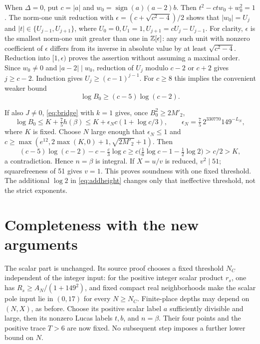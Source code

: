 \documentclass[11pt,a4paper]{article}
\begin{document}
When $\Delta=0$, put $c=|a|$ and $w_0=\operatorname{sign}(a)(a-2)b$.
Then $t^2-ctw_0+w_0^2=1$. The norm-one unit reduction with
$\epsilon=(c+\sqrt{c^2-4})/2$ shows that $|w_0|=U_j$ and
$|t|\in\{U_{j-1},U_{j+1}\}$, where
$U_0=0,U_1=1,U_{j+1}=cU_j-U_{j-1}$.
For clarity, $\epsilon$ is the smallest norm-one unit greater than
one in $\mathbb Z[\epsilon]$: any such unit with nonzero coefficient of
$\epsilon$ differs from its inverse in absolute value by at least
$\sqrt{c^2-4}$. Reduction into $[1,\epsilon)$ proves the assertion
without assuming a maximal order. Since $w_0\ne0$ and
$|a-2|\mid w_0$, reduction of $U_j$ modulo $c-2$ or $c+2$ gives
$j\ge c-2$. Induction gives $U_j\ge(c-1)^{j-1}$. For $c\ge8$ this
implies the convenient weaker bound
\[
                        \log B_0\ge(c-5)\log(c-2).
\]

If also $J\ne0$, \eqref{eq:bridge} with $k=1$ gives, once
$B_0^2\ge2M'_2$,
\[
 \log B_0\le K+\tfrac75 h(\beta)
 \le K+\epsilon_N c(1+\log c/3),\qquad
 \epsilon_N=\tfrac75\,2^{330770}149^{-L_N},
\]
where $K$ is fixed. Choose $N$ large enough that $\epsilon_N\le1$
and $c\ge\max(e^{12},2\max(K,0)+1,\sqrt{2M'_2}+1)$.
Then
\[
(c-5)\log(c-2)-c-\tfrac c3\log c
 \ge c\bigl(\tfrac16\log c-1-\tfrac12\log2\bigr)>c/2>K,
\]
a contradiction. Hence $n=\beta$ is integral. If $X=u/v$ is
reduced, $v^2\mid51$; squarefreeness of 51 gives $v=1$.
This proves soundness with one fixed threshold. The additional
$\log2$ in \eqref{eq:addheight} changes only that ineffective
threshold, not the strict exponents.

\section{Completeness with the new arguments}
The scalar part is unchanged. Its source proof chooses a fixed
threshold $N_C$ independent of the integer input: for the positive
integer scalar product $r_s$, one has
$R_s\ge A_N/(1+149^2)$, and fixed compact real neighborhoods make
the scalar pole input lie in $(0,17)$ for every $N\ge N_C$.
Finite-place depths may depend on $(N,X)$, as before. Choose its
positive scalar label $a$ sufficiently divisible and large, then its
nonzero Lucas labels $t,b$, and $n=\beta$. Their four points and the
positive trace $T>6$ are now fixed. No subsequent step imposes a
further lower bound on $N$.
\end{document}
